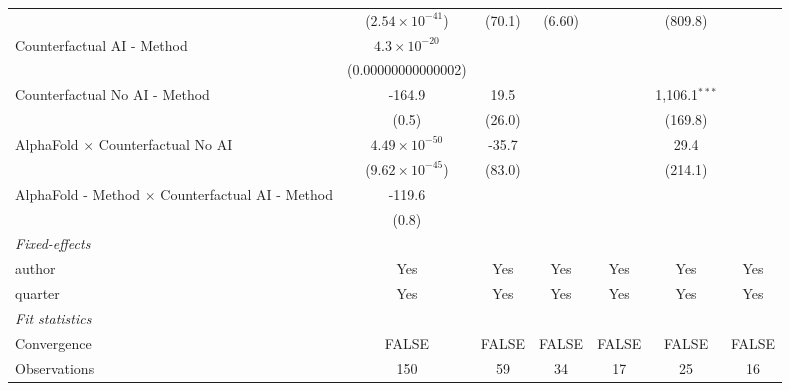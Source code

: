 \begin{tabular}{lcccccc}
                                                           & ($2.54\times 10^{-41}$)  & (70.1) & (6.60)       &              & (809.8)         &   \\   
   Counterfactual AI - Method                              & $4.3\times 10^{-20}$     &        &              &              &                 &   \\   
                                                           & (0.00000000000002)       &        &              &              &                 &   \\   
   Counterfactual No AI - Method                           & -164.9                   & 19.5   &              &              & 1,106.1$^{***}$ &   \\   
                                                           & (0.5)                    & (26.0) &              &              & (169.8)         &   \\   
   AlphaFold $\times$ Counterfactual No AI                 & $4.49\times 10^{-50}$    & -35.7  &              &              & 29.4            &   \\   
                                                           & ($9.62\times 10^{-45}$)  & (83.0) &              &              & (214.1)         &   \\   
   AlphaFold - Method $\times$ Counterfactual AI - Method  & -119.6                   &        &              &              &                 &   \\   
                                                           & (0.8)                    &        &              &              &                 &   \\   
   \midrule
   \emph{Fixed-effects}\\
   author                                                  & Yes                      & Yes    & Yes          & Yes          & Yes             & Yes\\  
   quarter                                                 & Yes                      & Yes    & Yes          & Yes          & Yes             & Yes\\  
   \midrule
   \emph{Fit statistics}\\
   Convergence                                             &FALSE                     & FALSE  & FALSE        & FALSE        & FALSE           & FALSE\\  
   Observations                                            & 150                      & 59     & 34           & 17           & 25              & 16\\  

\end{tabular}
